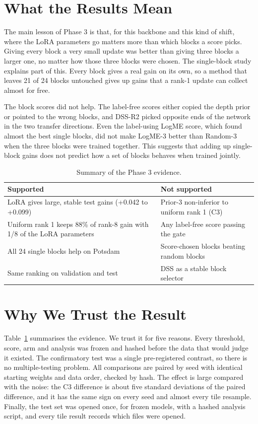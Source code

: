 \documentclass[11pt,a4paper]{report}
\begin{document}
\section{What the Results Mean}

The main lesson of Phase 3 is that, for this backbone and this kind of shift, where the LoRA parameters go matters more than which blocks a score picks. Giving every block a very small update was better than giving three blocks a larger one, no matter how those three blocks were chosen. The single-block study explains part of this. Every block gives a real gain on its own, so a method that leaves 21 of 24 blocks untouched gives up gains that a rank-1 update can collect almost for free.

The block scores did not help. The label-free scores either copied the depth prior or pointed to the wrong blocks, and DSS-R2 picked opposite ends of the network in the two transfer directions. Even the label-using LogME score, which found almost the best single blocks, did not make LogME-3 better than Random-3 when the three blocks were trained together. This suggests that adding up single-block gains does not predict how a set of blocks behaves when trained jointly.

\begin{table}[t]
\centering
\caption{Summary of the Phase 3 evidence.}
\label{tab:summary}
\small
\begin{tabular}{@{}p{3.6cm}p{3.6cm}@{}}
\toprule
\textbf{Supported} & \textbf{Not supported} \\
\midrule
LoRA gives large, stable test gains (+0.042 to +0.099) & Prior-3 non-inferior to uniform rank 1 (C3) \\
Uniform rank 1 keeps 88\% of rank-8 gain with 1/8 of the LoRA parameters & Any label-free score passing the gate \\
All 24 single blocks help on Potsdam & Score-chosen blocks beating random blocks \\
Same ranking on validation and test & DSS as a stable block selector \\
\bottomrule
\end{tabular}
\end{table}

\section{Why We Trust the Result}

Table~\ref{tab:summary} summarises the evidence. We trust it for five reasons. Every threshold, score, arm and analysis was frozen and hashed before the data that would judge it existed. The confirmatory test was a single pre-registered contrast, so there is no multiple-testing problem. All comparisons are paired by seed with identical starting weights and data order, checked by hash. The effect is large compared with the noise: the C3 difference is about five standard deviations of the paired difference, and it has the same sign on every seed and almost every tile resample. Finally, the test set was opened once, for frozen models, with a hashed analysis script, and every tile result records which files were opened.
\end{document}
